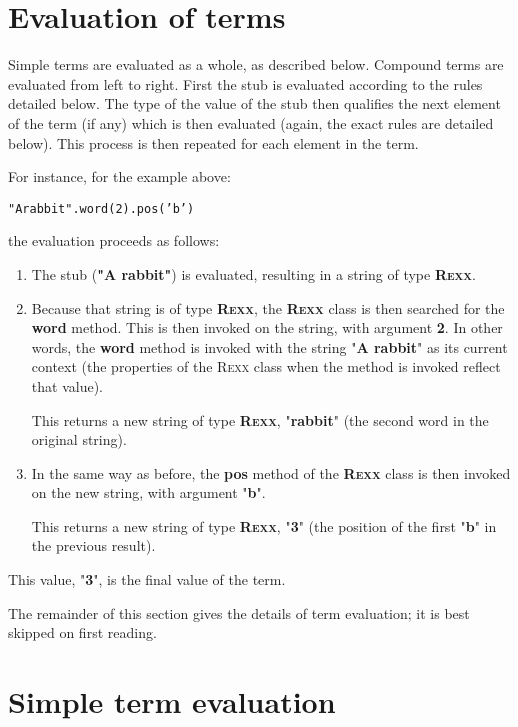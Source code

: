 \section{Evaluation of terms}\label{refteval}
 
Simple terms are evaluated as a whole, as described below.
Compound terms are evaluated from left to right.  First the stub is
evaluated according to the rules detailed below.
The type of the value of the stub then qualifies the next element of the
term (if any) which is then evaluated (again, the exact rules are
detailed below).
This process is then repeated for each element in the term.
 
For instance, for the example above:
\begin{alltt}
"A rabbit".word(2).pos('b')
\end{alltt}
the evaluation proceeds as follows:
\begin{enumerate}
\item The stub (\textbf{"A rabbit"}) is evaluated, resulting in a string
of type \textbf{R\textsc{exx}}.
\item 
Because that string is of type \textbf{R\textsc{exx}}, the \textbf{R\textsc{exx}} class
is then searched for the \textbf{word} method.  This is then invoked
on the string, with argument \textbf{2}.
In other words, the \textbf{word} method is invoked with the string
"\textbf{A rabbit}" as its current context (the properties of the
R\textsc{exx} class when the method is invoked reflect that value).
 
This returns a new string of type \textbf{R\textsc{exx}},
"\textbf{rabbit}" (the second word in the original string).
\item 
In the same way as before, the \textbf{pos} method of
the \textbf{R\textsc{exx}} class is then invoked on the new string, with
argument "\textbf{b}".
 
This returns a new string of type \textbf{R\textsc{exx}}, "\textbf{3}"
(the position of the first "\textbf{b}" in the previous result).
\end{enumerate}
This value, "\textbf{3}", is the final value of the term.
 
The remainder of this section gives the details of term
evaluation; it is best skipped on first reading.
\section{Simple term evaluation}
 
